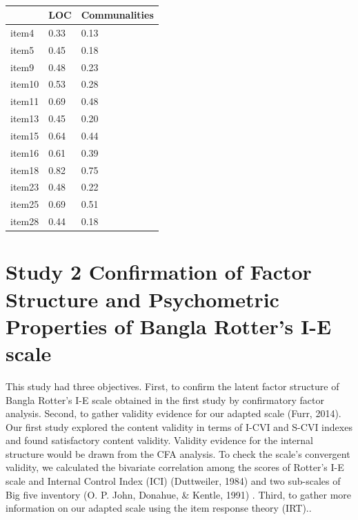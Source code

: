 \documentclass[
  english,
  man]{apa6}
\begin{document}
\begin{table}[tbp]

\begin{center}
\begin{threeparttable}

\caption{\label{tab:TabEFA1}}

\begin{tabular}{lll}
\toprule
 & \multicolumn{1}{c}{LOC} & \multicolumn{1}{c}{Communalities}\\
\midrule
item4 & 0.33 & 0.13\\
item5 & 0.45 & 0.18\\
item9 & 0.48 & 0.23\\
item10 & 0.53 & 0.28\\
item11 & 0.69 & 0.48\\
item13 & 0.45 & 0.20\\
item15 & 0.64 & 0.44\\
item16 & 0.61 & 0.39\\
item18 & 0.82 & 0.75\\
item23 & 0.48 & 0.22\\
item25 & 0.69 & 0.51\\
item28 & 0.44 & 0.18\\
\bottomrule
\end{tabular}

\end{threeparttable}
\end{center}

\end{table}

\hypertarget{study-2-confirmation-of-factor-structure-and-psychometric-properties-of-bangla-rotters-i-e-scale}{%
\section{Study 2 Confirmation of Factor Structure and Psychometric Properties of Bangla Rotter's I-E scale}\label{study-2-confirmation-of-factor-structure-and-psychometric-properties-of-bangla-rotters-i-e-scale}}

This study had three objectives. First, to confirm the latent factor structure of Bangla Rotter's I-E scale obtained in the first study by confirmatory factor analysis. Second, to gather validity evidence for our adapted scale (Furr, 2014). Our first study explored the content validity in terms of I-CVI and S-CVI indexes and found satisfactory content validity. Validity evidence for the internal structure would be drawn from the CFA analysis. To check the scale's convergent validity, we calculated the bivariate correlation among the scores of Rotter's I-E scale and Internal Control Index (ICI) (Duttweiler, 1984) and two sub-scales of Big five inventory (O. P. John, Donahue, \& Kentle, 1991) . Third, to gather more information on our adapted scale using the item response theory (IRT)..
\end{document}
